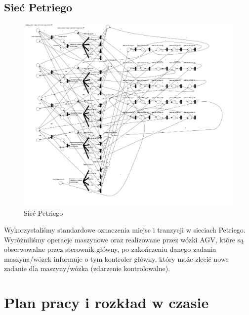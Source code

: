 \documentclass[10pt, a4paper]{article}
\begin{document}
\subsection{Sieć Petriego}

 \begin{figure}[H]
  \begin{center}
    \includegraphics[width=1\textwidth]{./obrazki/Petri.png}
    \caption{Sieć Petriego}
    \label{fig:petri}
  \end{center}
 \end{figure}
Wykorzystaliśmy standardowe oznaczenia miejsc i tranzycji w sieciach Petriego. Wyróżniliśmy operacje maszynowe oraz realizowane przez wózki AGV, które są obserwowalne przez sterownik główny, po zakończeniu danego zadania maszyna/wózek informuje o tym kontroler główny, który może zlecić nowe zadanie dla maszyny/wózka (zdarzenie kontrolowalne).

\section{Plan pracy i rozkład w czasie}
\label{sec:org}
\end{document}
